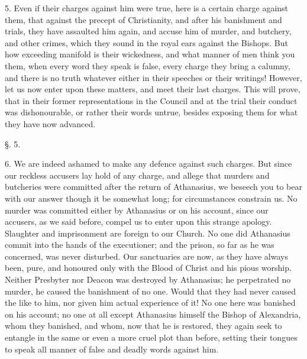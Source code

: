 5. Even if their charges against him were true,
here is a certain charge against them, that against the precept of
Christianity, and after his banishment and trials, they have assaulted
him again, and accuse him of murder, and butchery, and other crimes,
which they sound in the royal ears against the Bishops. But how
exceeding manifold is their wickedness, and what manner of men think
you them, when every word they speak is false, every charge they bring
a calumny, and there is no truth whatever either in their speeches or
their writings! However, let us now enter upon these matters, and meet
their last charges. This will prove, that in their former
representations in the Council and at the trial their conduct was
dishonourable, or rather their words untrue, besides exposing them for
what they have now advanced.

§. 5.

6. We are indeed ashamed to make any defence
against such charges. But since our reckless accusers lay hold of any
charge, and allege that murders and butcheries were committed
after the return of Athanasius, we beseech you to bear with our answer
though it be somewhat long; for circumstances constrain us. No murder
was committed either by Athanasius or on his account, since our
accusers, as we said before, compel us to enter upon this strange
apology. Slaughter and imprisonment are foreign to our Church. No one
did Athanasius commit into the hands of the executioner; and the
prison, so far as he was concerned, was never disturbed. Our
sanctuaries are now, as they have always been, pure, and honoured only
with the Blood of Christ and his pious worship. Neither Presbyter nor
Deacon was destroyed by Athanasius; he perpetrated no murder, he
caused the banishment of no one. Would that they had never caused the
like to him, nor given him actual experience of it! No one here was
banished on his account; no one at all except Athanasius himself the
Bishop of Alexandria, whom they banished, and whom, now that he is
restored, they again seek to entangle in the same or even a more cruel
plot than before, setting their tongues to speak all manner of false
and deadly words against him.

